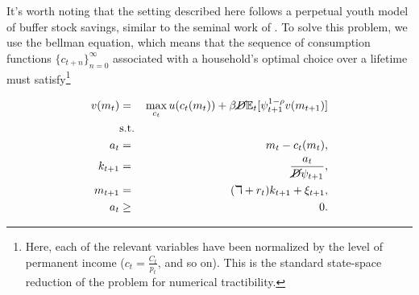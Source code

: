 \par It's worth noting that the setting described here follows a perpetual youth model of buffer stock savings, similar to the seminal work of \cite{ks1998}. To solve this problem, we use the bellman equation, which means that the sequence of consumption functions $\{c_{t+n}\}^{\infty}_{n=0}$ associated with a household's optimal choice over a lifetime must satisfy\footnote{Here, each of the relevant variables have been normalized by the level of permanent income ($c_t = \frac{C_t}{p_t}$, and so on). This is the standard state-space reduction of the problem for numerical tractibility.} 

\begin{eqnarray*}
  v(m_t) &=& \max_{c_t} u(c_t(m_t)) + \beta \cancel{D} \mathbb{E}_{t}[\psi_{t+1}^{1-\rho}v(m_{t+1})] \\
  &\text{s.t.}& \\
  a_t &=& m_t - c_t(m_t), \\
  k_{t+1} &=& \frac{a_t}{\cancel{D}\psi_{t+1}}, \\
  m_{t+1} &=& (\daleth + r_t)k_{t+1} + \xi_{t+1}, \\
  a_t &\geq& 0.
\end{eqnarray*}






    



